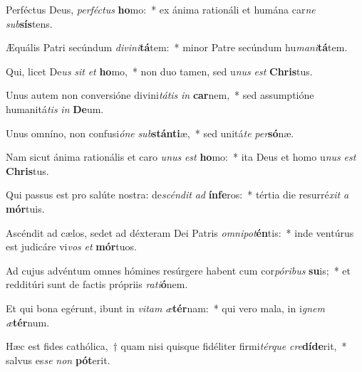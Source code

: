 \item Perféctus Deus, \textit{per}\textit{féc}\textit{tus} \textbf{ho}mo:~* ex ánima rationáli et humána car\textit{ne} \textit{sub}\textbf{sís}tens.
\item Æquális Patri secúndum \textit{di}\textit{vi}\textit{ni}\textbf{tá}tem:~* minor Patre secúndum hu\textit{ma}\textit{ni}\textbf{tá}tem.
\item Qui, licet De\textit{us} \textit{sit} \textit{et} \textbf{ho}mo,~* non duo tamen, sed u\textit{nus} \textit{est} \textbf{Chris}tus.
\item Unus autem non conversióne divini\textit{tá}\textit{tis} \textit{in} \textbf{car}nem,~* sed assumptióne humanitá\textit{tis} \textit{in} \textbf{De}um.
\item Unus omníno, non confusi\textit{ó}\textit{ne} \textit{sub}\textbf{stán}\textbf{ti}æ,~* sed unitá\textit{te} \textit{per}\textbf{só}næ.
\item Nam sicut ánima rationális et caro \textit{u}\textit{nus} \textit{est} \textbf{ho}mo:~* ita Deus et homo u\textit{nus} \textit{est} \textbf{Chris}tus.
\item Qui passus est pro salúte nostra: de\textit{scén}\textit{dit} \textit{ad} \textbf{ín}\textbf{fe}ros:~* tértia die resurré\textit{xit} \textit{a} \textbf{mór}tuis.
\item Ascéndit ad cælos, sedet ad déxteram Dei Patris \textit{om}\textit{ni}\textit{pot}\textbf{én}tis:~* inde ventúrus est judicáre vi\textit{vos} \textit{et} \textbf{mór}tuos.
\item Ad cujus advéntum omnes hómines resúrgere habent cum cor\textit{pó}\textit{ri}\textit{bus} \textbf{su}is;~* et redditúri sunt de factis própriis \textit{ra}\textit{ti}\textbf{ó}nem.
\item Et qui bona egérunt, ibunt in \textit{vi}\textit{tam} \textit{æ}\textbf{tér}nam:~* qui vero mala, in i\textit{gnem} \textit{æ}\textbf{tér}num.
\item Hæc est fides cathólica,~† quam nisi quisque fidéliter firmi\textit{tér}\textit{que} \textit{cre}\textbf{dí}\textbf{de}rit,~* salvus es\textit{se} \textit{non} \textbf{pót}erit.
